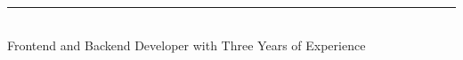 \documentclass[10pt,A4]{article}
\begin{document}
\setlength{\columnsep}{0.5cm}
\setlength{\columnseprule}{4pt}

\begin{paracol}{2}
\begin{leftcolumn}

\begin{center}
\end{center} 

\begin {center}
	\LARGE{ \textbf{ \uppercase{ \gfullname } } } \\[-10pt]
	\textcolor{red}{ \rule{0.1\textwidth}{1.25pt} } \\[10pt]
	\large{ Frontend and Backend Developer with Three Years of Experience }
\end {center}

\\[6pt]
\\[6pt]
\\[6pt]
\\[6pt]



\end{leftcolumn}
\end{paracol}
\end{document}

